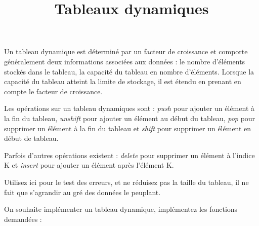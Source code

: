 \documentclass[french,a4paper,addpoints,11pt]{exam}
\title{Tableaux dynamiques}
\begin{document}
\maketitle
\thispagestyle{headandfoot}

\ifprintanswers
\else
\begin{multicols}{2}
\fi
Un tableau dynamique est déterminé par un facteur de croissance et comporte généralement deux informations associées aux données : le nombre d'éléments stockés dans le tableau, la capacité du tableau en nombre d'éléments. Lorsque la capacité du tableau atteint la limite de stockage, il est étendu en prenant en compte le facteur de croissance.

Les opérations sur un tableau dynamiques sont : \emph{push} pour ajouter un élément à la fin du tableau, \emph{unshift} pour ajouter un élément au début du tableau, \emph{pop} pour supprimer un élément à la fin du tableau et \emph{shift} pour supprimer un élément en début de tableau.

Parfois d'autres opérations existent : \emph{delete} pour supprimer un élément à l'indice K et \emph{insert} pour ajouter un élément après l'élément K.

Utilisez ici  pour le test des erreurs, et ne réduisez pas la taille du tableau, il ne fait que s'agrandir au gré des données le peuplant.
\begin{questions}

\question On souhaite implémenter un tableau dynamique, implémentez les fonctions demandées :

\end{questions}
\end{multicols}
\end{document}
